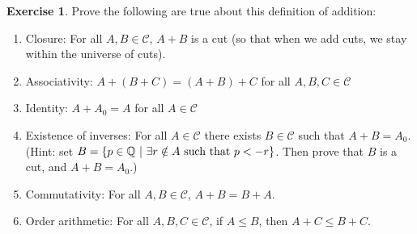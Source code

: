 \documentclass{article}
\theoremstyle{definition}
\newtheorem{exercise}{Exercise}
\newcommand{\Q}{\mathbb{Q}}
\begin{document}
\begin{exercise}
Prove the following are true about this definition of addition:
\begin{enumerate}
\item Closure: For all $A, B\in \mathcal{C}$, $A+B$ is a cut (so that when we add cuts, we stay within the universe of cuts).
\item Associativity: $A+(B+C)=(A+B)+C$ for all $A, B, C\in \mathcal{C}$
\item Identity: $A+A_0=A$ for all $A\in \mathcal{C}$
\item Existence of inverses: For all $A\in \mathcal{C}$ there exists $B\in \mathcal{C}$ such that $A+B=A_0$. (Hint: set $B=\{p\in \Q\ | \ \exists r\notin A\hbox{ such that }p<-r\}$. Then prove that $B$ is a cut, and $A+B=A_0$.)
\item Commutativity: For all $A, B\in \mathcal{C}$, $A+B=B+A$.
\item Order arithmetic: For all $A, B, C\in \mathcal{C}$, if $A\leq B$, then $A+C\leq B+C$.
\end{enumerate}
\end{exercise}
\end{document}
